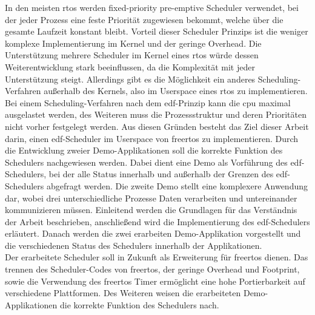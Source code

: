 \documentclass[../EDF Master Thesis.tex]{subfiles}
\begin{document}
    In den meisten \ac{rtos} werden fixed-priority pre-emptive Scheduler verwendet, bei der jeder Prozess eine feste Priorität zugewiesen bekommt, welche über die gesamte Laufzeit konstant bleibt.
    Vorteil dieser Scheduler Prinzips ist die weniger komplexe Implementierung im Kernel und der geringe Overhead.
    Die Unterstützung mehrere Scheduler im Kernel eines \ac{rtos} würde dessen Weiterentwicklung stark beeinflussen, da die Komplexität mit jeder Unterstützung steigt.
    Allerdings gibt es die Möglichkeit ein anderes Scheduling-Verfahren außerhalb des Kernels, also im Userspace eines \ac{rtos} zu implementieren.
    Bei einem Scheduling-Verfahren nach dem \ac{edf}-Prinzip kann die \ac{cpu} maximal ausgelastet werden, des Weiteren muss die Prozessstruktur und deren Prioritäten nicht vorher festgelegt werden.
    Aus diesen Gründen besteht das Ziel dieser Arbeit darin, einen \ac{edf}-Scheduler im Userspace von \ac{freertos} zu implementieren.
    Durch die Entwicklung zweier Demo-Applikationen soll die korrekte Funktion des Schedulers nachgewiesen werden.
    Dabei dient eine Demo als Vorführung des \ac{edf}-Schedulers, bei der alle Status innerhalb und außerhalb der Grenzen des \ac{edf}-Schedulers abgefragt werden.
    Die zweite Demo stellt eine komplexere Anwendung dar, wobei drei unterschiedliche Prozesse Daten verarbeiten und untereinander kommunizieren müssen. 
    Einleitend werden die Grundlagen für das Verständnis der Arbeit beschrieben, anschließend wird die Implementierung des \ac{edf}-Schedulers erläutert.
    Danach werden die zwei erarbeiten Demo-Applikation vorgestellt und die verschiedenen Status des Schedulers innerhalb der Applikationen.\\
    Der erarbeitete Scheduler soll in Zukunft als Erweiterung für \ac{freertos} dienen.
    Das trennen des Scheduler-Codes von \ac{freertos}, der geringe Overhead und Footprint, sowie die Verwendung des \ac{freertos} Timer ermöglicht eine hohe Portierbarkeit auf verschiedene Plattformen.
    Des Weiteren weisen die erarbeiteten Demo-Applikationen die korrekte Funktion des Schedulers nach.
\end{document}
